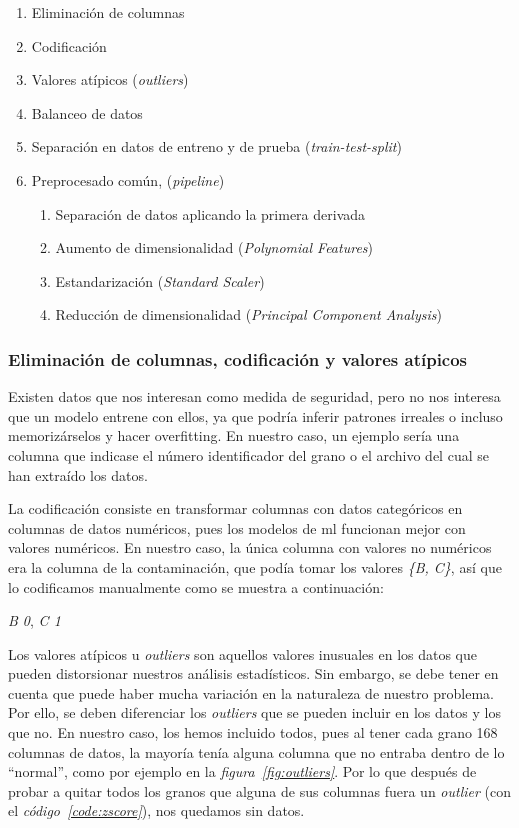 \begin{enumerate}
    \item Eliminación de columnas
    \item Codificación
    \item Valores atípicos (\textit{outliers})
    \item Balanceo de datos
    \item Separación en datos de entreno y de prueba (\textit{train-test-split})
    \item Preprocesado común, (\textit{pipeline})
    \begin{enumerate}
        \item Separación de datos aplicando la primera derivada 
        \item Aumento de dimensionalidad (\textit{Polynomial Features})
        \item Estandarización  (\textit{Standard Scaler})
        \item Reducción de dimensionalidad (\textit{Principal Component Analysis})
    \end{enumerate}
    
\end{enumerate}


\subsubsection{Eliminación de columnas, codificación y valores atípicos}

Existen datos que nos interesan como medida de seguridad, pero no nos interesa que un modelo entrene con ellos, ya que podría inferir patrones irreales o incluso memorizárselos y hacer \gls{overfitting}. En nuestro caso, un ejemplo sería una columna que indicase el número identificador del grano o el archivo del cual se han extraído los datos.

La codificación consiste en transformar columnas con datos categóricos en columnas de datos numéricos, pues los modelos de \acrshort{ml} funcionan mejor con valores numéricos. En nuestro caso, la única columna con valores no numéricos era la columna de la contaminación, que podía tomar los valores \textit{\{B, C\}}, así que lo codificamos manualmente como se muestra a continuación:

{\centering
    \textit{B \longrightarrow{} 0}, \textit{C \longrightarrow{} 1}\par
}

Los valores atípicos u \textit{outliers} son aquellos valores inusuales en los datos que pueden distorsionar nuestros análisis estadísticos. Sin embargo, se debe tener en cuenta que puede haber mucha variación en la naturaleza de nuestro problema. Por ello, se deben diferenciar los \textit{outliers} que se pueden incluir en los datos y los que no. En nuestro caso, los hemos incluido todos, pues al tener cada grano 168 columnas de datos, la mayoría tenía alguna columna que no entraba dentro de lo ``normal'', como por ejemplo en la \textit{figura\ \ref{fig:outliers}}. Por lo que después de probar a quitar todos los granos que alguna de sus columnas fuera un \textit{outlier} (con el \textit{código\ \ref{code:zscore}}), nos quedamos sin datos.

